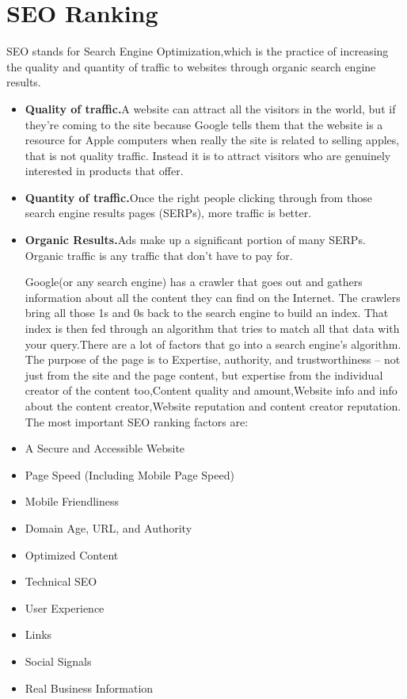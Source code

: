 \documentclass{fisatproject}
\begin{document}
\section{SEO Ranking}
SEO stands for Search Engine Optimization,which is  the practice of increasing the quality and quantity of traffic to websites through organic search engine results.
\begin{itemize}
	\item \textbf{Quality of traffic.}A website can attract all the visitors in the world, but if they're coming to the site because Google tells them that the website is  a resource for Apple computers when really the site is related to selling apples, that is not quality traffic. Instead it is to attract visitors who are genuinely interested in products that offer.
	\item \textbf{Quantity of traffic.}Once the right people clicking through from those search engine results pages (SERPs), more traffic is better.
	\item \textbf{Organic Results.}Ads make up a significant portion of many SERPs. Organic traffic is any traffic that don't have to pay for.
	
	Google(or any search engine) has a crawler that goes out and gathers information about all the content they can find on the Internet. The crawlers bring all those 1s and 0s back to the search engine to build an index. That index is then fed through an algorithm that tries to match all that data with your query.There are a lot of factors that go into a search engine's algorithm.
	The purpose of the page is to Expertise, authority, and trustworthiness – not just from the site and the page content, but expertise from the individual creator of the content too,Content quality and amount,Website info and info about the content creator,Website reputation and content creator reputation.\newline
	\newline
	The most important SEO ranking factors are:
	\item A Secure and Accessible Website
	\item Page Speed (Including Mobile Page Speed)
	\item Mobile Friendliness
	\item Domain Age, URL, and Authority
	\item Optimized Content
	\item Technical SEO
	\item User Experience
	\item Links
	\item Social Signals
	\item Real Business Information
	\newline
	\newline
	\newline
	\newline
	\newline
	\newline
\end{itemize}
\end{document}
